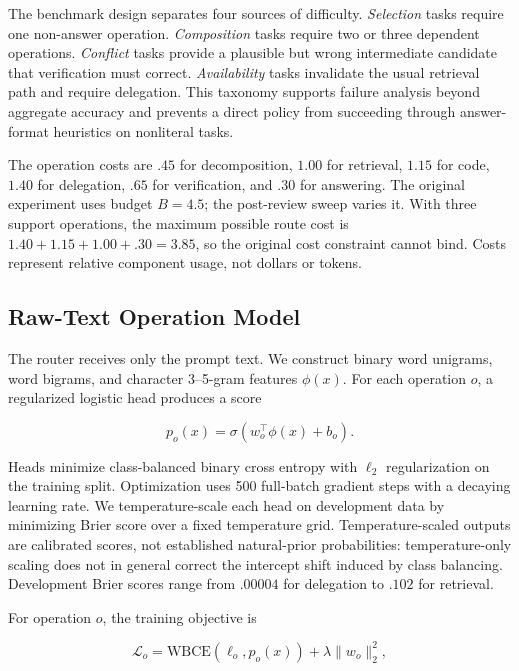 \documentclass[letterpaper]{article} %
\begin{document}
The benchmark design separates four sources of difficulty. \emph{Selection} tasks require one non-answer operation. \emph{Composition} tasks require two or three dependent operations. \emph{Conflict} tasks provide a plausible but wrong intermediate candidate that verification must correct. \emph{Availability} tasks invalidate the usual retrieval path and require delegation. This taxonomy supports failure analysis beyond aggregate accuracy and prevents a direct policy from succeeding through answer-format heuristics on nonliteral tasks.

The operation costs are $.45$ for decomposition, $1.00$ for retrieval, $1.15$ for code, $1.40$ for delegation, $.65$ for verification, and $.30$ for answering. The original experiment uses budget $B=4.5$; the post-review sweep varies it. With three support operations, the maximum possible route cost is $1.40+1.15+1.00+.30=3.85$, so the original cost constraint cannot bind. Costs represent relative component usage, not dollars or tokens.

\subsection{Raw-Text Operation Model}

The router receives only the prompt text. We construct binary word unigrams, word bigrams, and character 3--5-gram features $\phi(x)$. For each operation $o$, a regularized logistic head produces a score

\begin{equation}
p_o(x)=\sigma(w_o^\top\phi(x)+b_o).
\end{equation}

Heads minimize class-balanced binary cross entropy with $\ell_2$ regularization on the training split. Optimization uses 500 full-batch gradient steps with a decaying learning rate. We temperature-scale each head on development data by minimizing Brier score over a fixed temperature grid. Temperature-scaled outputs are calibrated scores, not established natural-prior probabilities: temperature-only scaling does not in general correct the intercept shift induced by class balancing. Development Brier scores range from $.00004$ for delegation to $.102$ for retrieval.

For operation $o$, the training objective is

\begin{equation}
\mathcal{L}_o=\mathrm{WBCE}(\ell_o,p_o(x))+\lambda\|w_o\|_2^2,
\end{equation}
\end{document}
